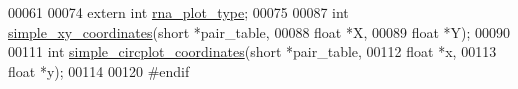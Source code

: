 \begin{DoxyCode}
00061 
00074 \textcolor{keyword}{extern} \textcolor{keywordtype}{int} \mbox{\hyperlink{group__plotting__utils_ga5964c4581431b098b80027d6e14dcdd4}{rna\_plot\_type}};
00075 
00087 \textcolor{keywordtype}{int} \mbox{\hyperlink{group__plotting__utils_gaf4b9173e7d3fd361c3c85e6def194123}{simple\_xy\_coordinates}}(\textcolor{keywordtype}{short} *pair\_table,
00088                           \textcolor{keywordtype}{float} *X,
00089                           \textcolor{keywordtype}{float} *Y);
00090 
00111 \textcolor{keywordtype}{int} \mbox{\hyperlink{group__plotting__utils_gac4ea13d35308f09940178d2b05a248c2}{simple\_circplot\_coordinates}}(\textcolor{keywordtype}{short} *pair\_table,
00112                                 \textcolor{keywordtype}{float} *x,
00113                                 \textcolor{keywordtype}{float} *y);
00114 
00120 \textcolor{preprocessor}{#endif}
\end{DoxyCode}
